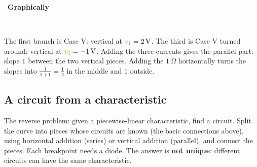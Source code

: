 \documentclass[11pt,a4paper]{article}
\newcommand{\Vcol}[1]{\textcolor{cvolt}{#1}}
\newif\ifsolfirst
\newcommand{\solstep}[2]{\par\ifsolfirst\global\solfirstfalse\else\bigskip\needspace{5\baselineskip}\fi
  \noindent{\color{cpow}\bfseries Step #1.}\ {\bfseries #2}\par\nobreak\smallskip}
\newcommand{\ohm}{\,\Omega}
\newcommand{\yes}{\textcolor{cpow}{\checkmark}}
\newcommand{\pR}[1]{\draw[crv] (-#1,-#1*0.8) -- (#1,#1*0.8);}                %
\newcommand{\pframe}[2]{%
  \draw[vax] (-1.3,0) -- (1.3,0) node[right=0pt, font=\tiny, text=cvolt] {$v$};
  \draw[vax] (0,-1.1) -- (0,1.15) node[above=0pt, font=\tiny, text=ccur] {$i$};
  \node[font=\scriptsize, text=metugray] at (0,-1.4) {#2};}
\newcommand{\threeplots}[7]{%
  \begin{scope}\pframe{0}{#5}#1\end{scope}
  \node[font=\large] at (2.05,0) {#4};
  \begin{scope}[xshift=4.1cm]\pframe{0}{#6}#2\end{scope}
  \node[font=\large] at (6.15,0) {$=$};
  \begin{scope}[xshift=8.2cm]\pframe{0}{#7}#3\end{scope}}
\newcommand{\minic}[3]{%
  \begin{scope}[shift={(#1-0.55,1.75)}, scale=\miniscale, transform shape]
    \draw (0,#2) node[ocirc] {}; \draw (0,0) node[ocirc] {};
    #3
  \end{scope}}
\newcommand{\mlab}[1]{{\Large #1}}
\newcommand{\miniscale}{0.62}
\newcommand{\mD}[3]{\draw (#1,#2) to[D*] (#1,#3);}
\newcommand{\mDr}[3]{\draw (#1,#3) to[D*] (#1,#2);}
\newcommand{\mR}[4]{\draw (#1,#2) to[R, l=\mlab{#4}] (#1,#3);}
\newcommand{\mE}[4]{\draw (#1,#2) to[american voltage source, l=\mlab{\Vcol{#4}}] (#1,#3);}   %
\newcommand{\mEr}[4]{\draw (#1,#3) to[american voltage source, l_=\mlab{\Vcol{#4}}] (#1,#2);} %
\newcommand{\mW}[2]{\draw (0,#1) -- (#2,#1); \draw (0,0) -- (#2,0);}                             %
\newcommand{\miniR}[2]{\minic{#1}{2.2}{\mW{2.2}{0.8} \mR{0.8}{2.2}{0}{#2}}}
\newcommand{\miniDtwo}[1]{\minic{#1}{3.6}{\mW{3.6}{0.8} \mD{0.8}{3.6}{1.8} \mE{0.8}{1.8}{0}{$2\V$}}}
\newcommand{\miniDrone}[1]{\minic{#1}{3.6}{\mW{3.6}{0.8} \mDr{0.8}{3.6}{1.8} \mEr{0.8}{1.8}{0}{$1\V$}}}
\newcommand{\miniPar}[2][0]{\minic{#2}{3.6}{\mW{3.6}{3.8} \mD{0.8}{3.6}{1.8} \mE{0.8}{1.8}{0}{$2\V$}
    \mR{2.3}{3.6}{0}{$1\ohm$} \mDr{3.8}{3.6}{1.8} \mEr{3.8}{1.8}{0}{$1\V$}}}
\newcommand{\miniOnePort}[1]{\minic{#1}{5.4}{\draw (0,5.4) -- (0.8,5.4); \mR{0.8}{5.4}{3.6}{$1\ohm$}
    \draw (0.8,3.6) -- (3.8,3.6); \draw (0,0) -- (3.8,0); \mD{0.8}{3.6}{1.8} \mE{0.8}{1.8}{0}{$2\V$}
    \mR{2.3}{3.6}{0}{$1\ohm$} \mDr{3.8}{3.6}{1.8} \mEr{3.8}{1.8}{0}{$1\V$}}}
\begin{document}
\solstep{6}{Graphically}
\begin{center}
\\[10pt]
\end{center}
The first branch is Case V: vertical at $\Vcol{v_1} = 2\V$. The third is Case V turned around:
vertical at $\Vcol{v_1} = -1\V$. Adding the three currents gives the parallel part: slope
$1$ between the two vertical pieces. Adding the $1\ohm$ horizontally turns the slopes
into $\frac{1}{1 + 1} = \frac12$ in the middle and $1$ outside. \ \yes

\subsection{A circuit from a characteristic}

The reverse problem: given a piecewise-linear characteristic, find a circuit. Split the curve
into pieces whose circuits are known (the basic connections above), using horizontal addition
(series) or vertical addition (parallel), and connect the pieces. Each breakpoint needs a
diode. The answer is \textbf{not unique}: different circuits can have the same characteristic.
\end{document}
